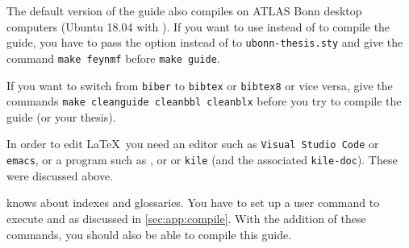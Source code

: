 
The default version of the guide also compiles on ATLAS Bonn desktop
computers (Ubuntu 18.04 with ). %
If you want to use
 instead of  to compile the guide, you
have to pass the option  instead of  to \texttt{ubonn-thesis.sty} 
and give the command \texttt{make feynmf} before \texttt{make guide}.

If you want to switch from \texttt{biber} to
\texttt{bibtex} or \texttt{bibtex8} or vice versa, give the commands
\texttt{make cleanguide cleanbbl cleanblx} before you try to compile
the guide (or your thesis).

In order to edit \LaTeX\ you need an editor such as
\texttt{Visual Studio Code} or \texttt{emacs}, or
a program such as , \TeXstudio or \TeXmaker or
\texttt{kile} (and the associated \texttt{kile-doc}).
These were discussed above.

\TeXstudio knows about indexes and glossaries. You have to set up a
user command to execute  and 
as discussed in \cref{sec:app:compile}. With the addition of
these commands, you should also be able to compile this guide.





